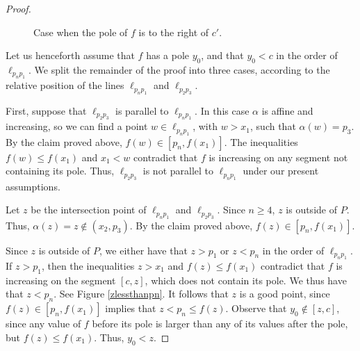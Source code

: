 \documentclass[11pt]{amsart}
\theoremstyle{remark}
\numberwithin{equation}{section}
\renewcommand{\leq}{\leqslant}
\renewcommand{\geq}{\geqslant}
\begin{document}
\begin{proof}
\begin{figure}[h]

\centering


\caption{Case when the pole of $f$ is to the right of $c'$.}
\label{polerightofcprime}
\end{figure}

Let us henceforth assume that $f$ has a  pole $y_0$, and that  $y_0<c$ in the order of $\ell_{p_np_1}$.
We split the remainder of the proof into  three cases, according to the relative position of the lines $\ell_{p_np_1}$ and $\ell_{p_2p_3}$.


First, suppose that $\ell_{p_2p_3}$ is parallel to $\ell_{p_np_1}$. In this case $\alpha$ is affine and increasing,  so we can find 
a point $w\in \ell_{p_np_1}$, with $w>x_1$, such that $\alpha(w)=p_3$. By the claim proved above, $f(w)\in[p_n,f(x_1)]$.
 The inequalities $f(w)\leq f(x_1)$ and $x_1< w$ contradict that $f$ is increasing on any segment not containing its pole.  Thus, 
 $\ell_{p_2p_3}$ is not parallel to $\ell_{p_np_1}$ under our present assumptions.



Let $z$ be the intersection point of  $\ell_{p_np_1}$ and $\ell_{p_2p_3}$.  Since $n\geq 4$, $z$ is outside of $P$. Thus, $\alpha(z)=z\notin (x_2,p_3)$. By the claim proved above,  $f(z)\in [p_n,f(x_1)]$.  

Since $z$ is outside of $P$, we either have that $z>p_1$
or $z<p_n$ in the order of $\ell_{p_np_1}$.  If $z>p_1$, then the inequalities $z>x_1$ and $f(z)\leq f(x_1)$ contradict that $f$ is increasing on the segment $[c,z]$, which does not contain its pole. We thus have that  $z<p_n$. See Figure \ref{zlessthanpn}.
It follows that $z$ is a good point, since $f(z)\in[p_n,f(x_1)]$ implies that $z<p_n\leq f(z)$. Observe that  $y_0\notin [z,c]$,  since any  value of $f$ before its pole is larger than any of its values after the pole, but $f(z)\leq f(x_1)$. Thus,  $y_0<z$.



\end{proof}
\end{document}
